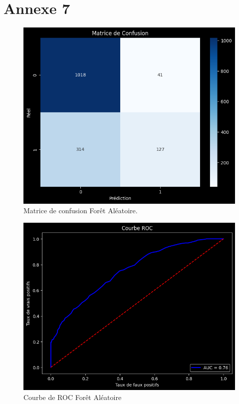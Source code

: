 \section*{Annexe 7}
\label{sec:annexe7}
\begin{figure}[H]
\centering
\includegraphics[width=1\textwidth]{figures/MatriceFoAl.png}
\caption{Matrice de confusion Forêt Aléatoire.}
\label{fig:annexe7}
\end{figure}


\begin{figure}[H]
\centering
\includegraphics[width=1\textwidth]{figures/ROCAL.png}
\caption{Courbe de ROC Forêt Aléatoire}
\end{figure}

